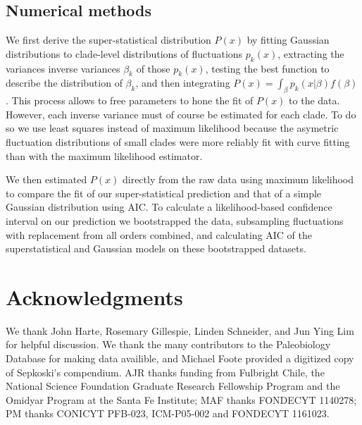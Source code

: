 \documentclass[12pt]{article}
\begin{document}
\subsection*{Numerical methods} \label{sec:numMeth} We first derive
the super-statistical distribution $P(x)$ by fitting Gaussian
distributions to clade-level distributions of fluctuations $p_k(x)$,
extracting the variances inverse variances $\beta_k$ of those
$p_k(x)$, testing the best function to describe the distribution of
$\beta_k$, and then integrating
$P(x) = \int_{\beta}p_k(x | \beta) f(\beta)$. This process allows to
free parameters to hone the fit of $P(x)$ to the data.  However, each
inverse variance must of course be estimated for each clade.  To do so
we use least squares instead of maximum likelihood because the
asymetric fluctuation distributions of small clades were more reliably
fit with curve fitting than with the maximum likelihood estimator.

We then estimated $P(x)$ directly from the raw data using maximum
likelihood to compare the fit of our super-statistical prediction and
that of a simple Gaussian distribution using AIC. To calculate a
likelihood-based confidence interval on our prediction we bootstrapped
the data, subsampling fluctuations with replacement from all orders
combined, and calculating AIC of the superstatistical and Gaussian
models on these bootstrapped datasets.





\section*{Acknowledgments}
We thank John Harte, Rosemary Gillespie, Linden Schneider, and Jun
Ying Lim for helpful discussion. We thank the many contributors to the
Paleobiology Database for making data availible, and Michael Foote
provided a digitized copy of Sepkoski's compendium. AJR thanks funding
from Fulbright Chile, the National Science Foundation Graduate
Research Fellowship Program and the Omidyar Program at the Santa Fe
Institute; MAF thanks FONDECYT 1140278; PM thanks CONICYT PFB-023,
ICM-P05-002 and FONDECYT 1161023.
\end{document}
